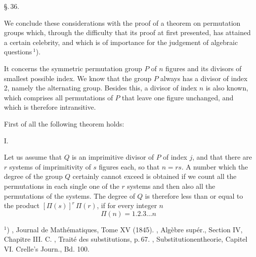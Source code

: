 \begin{center}
\S.\,36.

\end{center}

We conclude these considerations with the proof of a
theorem on permutation groups which, through the difficulty
that its proof at first presented, has attained a certain celebrity,
and which is of importance for the judgement of algebraic
questions\,$^{1}$).

It concerns the symmetric permutation group
 $P$ of $n$ figures and its divisors of smallest
possible index. We know that the group $P$ always has a
divisor of index 2, namely the alternating group.
Besides this, a divisor of index $n$ is also known, which comprises all
permutations of $P$ that leave one figure unchanged,
and which is therefore intransitive.

First of all the following theorem holds:

I. 

Let us assume that $Q$ is an imprimitive divisor of $P$
of index $j$, and that there are $r$ systems of imprimitivity of
$s$ figures each, so that $n = rs$. A number which the degree of the
group $Q$ certainly cannot exceed is obtained if we
count all the permutations in each single one of the $r$ systems and then
also all the permutations of the systems. The degree
of $Q$ is therefore less than or equal to the product $[\Pi(s)]^r\,\Pi(r)$,
if for every integer $n$
\[
\Pi(n) = 1.2.3\dots n
\]

$^{1}$) , Journal de Mathématiques, Tome XV (1845). ,
Algèbre supér., Section IV, Chapitre III. C. , Traité des substitutions,
p.\,67. , Substitutionentheorie, Capitel VI. Crelle's Journ.,
Bd. 100.
